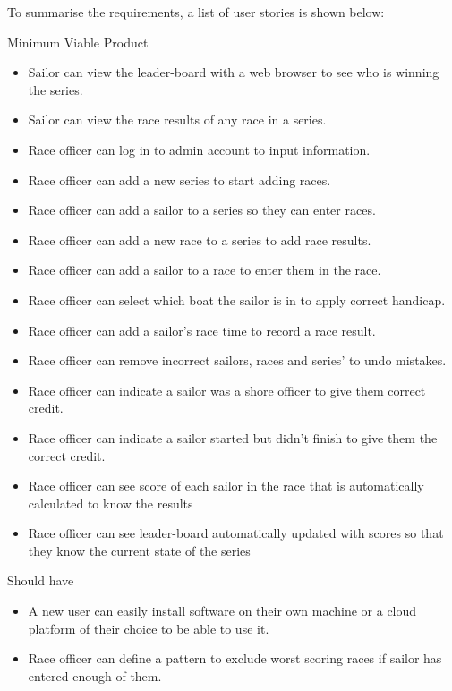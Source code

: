 \documentclass{l4proj}
\begin{document}
To summarise the requirements, a list of user stories is shown below:

Minimum Viable Product
\begin{itemize}
    \item
    Sailor can view the leader-board with a web browser to see who is winning the series.
    \item
    Sailor can view the race results of any race in a series.
    \item
    Race officer can log in to admin account to input information.
    \item
    Race officer can add a new series to start adding races.
    \item
    Race officer can add a sailor to a series so they can enter races.
    \item
    Race officer can add a new race to a series to add race results.
    \item
    Race officer can add a sailor to a race to enter them in the race.
    \item
    Race officer can select which boat the sailor is in to apply
    correct handicap.
    \item
    Race officer can add a sailor’s race time to record a race result.
    \item
    Race officer can remove incorrect sailors, races and series’ to undo mistakes.
    \item
    Race officer can indicate a sailor was a shore officer to give them correct credit.
    \item
    Race officer can indicate a sailor started but didn't finish to give them the correct credit.
    \item
    Race officer can see score of each sailor in the race that is automatically calculated to know the results
    \item
    Race officer can see leader-board automatically updated with scores so that they know the current state of the series
\end{itemize}

Should have

\begin{itemize}
    \item
    A new user can easily install software on their own machine or a cloud platform of their choice to be able to use it.
    \item
    Race officer can define a pattern to exclude worst scoring races if sailor has entered enough of them.
\end{itemize}
\end{document}
